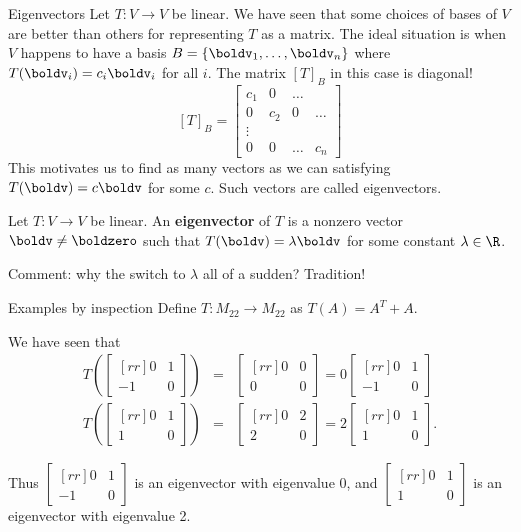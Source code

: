 \begin{frame}{Eigenvectors}
Let $T\colon V\rightarrow V$ be linear. We have seen that some choices of bases of $V$ are better than others for representing $T$ as a matrix. 
\bpause
The ideal situation is when $V$ happens to have a basis $B=\{\boldv_1,\dots, \boldv_n\}$ where $T(\boldv_i)=c_i\boldv_i$ for all $i$. The matrix $[T]_B$ in this case is diagonal!
\[
[T]_B=\begin{bmatrix}
c_1&0&\dots\\
0&c_2&0&\dots\\
\vdots &\\
0&0&\dots&c_n
\end{bmatrix}
\]  
\pause This motivates us to find as many vectors as we can satisfying $T(\boldv)=c\boldv$ for some $c$. Such vectors are called \alert{eigenvectors}.
\begin{definition}
Let $T\colon V\rightarrow V$ be linear. An {\bf eigenvector} of $T$ is a \alert{nonzero} vector $\boldv\ne\boldzero$ such that $T(\boldv)=\lambda\boldv$ for some constant $\lambda\in\R$.  
\end{definition}
\pause 
\alert{Comment:} why the switch to $\lambda$ all of a sudden? Tradition!  
\end{frame}
\begin{frame}{Examples by inspection}
Define $T\colon M_{22}\rightarrow M_{22}$ as $T(A)=A^T+A$. 

We have seen that 
\begin{eqnarray*}
T\left(\begin{bmatrix}[rr]
0&1\\
-1&0
\end{bmatrix}
\right)&=&\begin{bmatrix}[rr]
0&0\\
0&0
\end{bmatrix}=0\begin{bmatrix}[rr]
0&1\\
-1&0
\end{bmatrix}\\
T\left(\begin{bmatrix}[rr]
0&1\\
1&0
\end{bmatrix}
\right)&=&\begin{bmatrix}[rr]
0&2\\
2&0
\end{bmatrix}=2\begin{bmatrix}[rr]
0&1\\
1&0
\end{bmatrix}.
\end{eqnarray*}

\pause Thus $\begin{bmatrix}[rr]
0&1\\
-1&0
\end{bmatrix}$
is an eigenvector with eigenvalue 0, and $\begin{bmatrix}[rr]
0&1\\
1&0
\end{bmatrix}$ is an eigenvector with eigenvalue 2. 
\end{frame}
